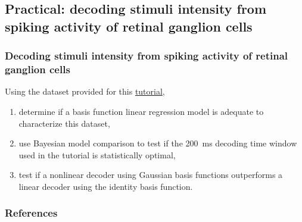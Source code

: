 \documentclass[11pt]{beamer}
\begin{document}
\subsection{Practical: decoding stimuli intensity from spiking activity of
retinal ganglion cells}

\begin{frame}
    \frametitle{Decoding stimuli intensity from spiking activity of
retinal ganglion cells}

    Using the dataset provided for this
    \href{https://compneuro.neuromatch.io/tutorials/W1D3_GeneralizedLinearModels/student/W1D3_Tutorial1.html}{tutorial},

    \begin{enumerate}[a]

        \item determine if a basis function linear regression model is adequate
            to characterize this dataset,

        \item use Bayesian model comparison to test if the 200~ms decoding time window
    used in the tutorial is statistically optimal,

        \item test if a nonlinear decoder using Gaussian basis functions
            outperforms a linear decoder using the identity basis function.

    \end{enumerate}

\end{frame}

\begin{frame}
    \frametitle{References}

    \tiny{
        
        
    }
\end{frame}
\end{document}
